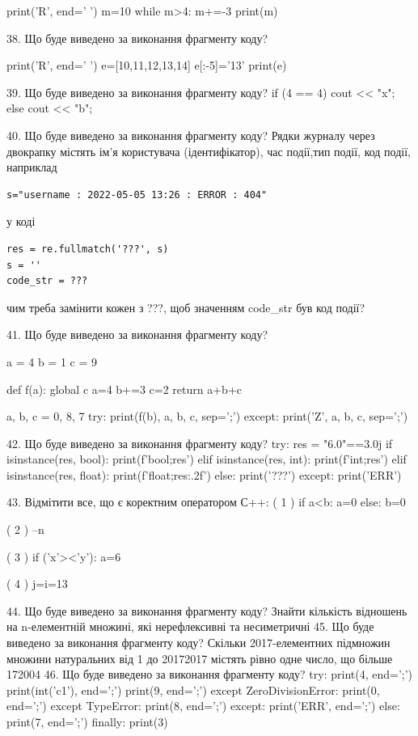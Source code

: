 \documentclass[11pt]{article}
\begin{document}
print('R', end=' ')
m=10
while m>4:
    m+=-3
print(m)


38. Що буде виведено за виконання фрагменту коду?

print('R', end=' ')
e=[10,11,12,13,14]
e[:-5]='13'
print(e)


39. Що буде виведено за виконання фрагменту коду?
if (4 == 4)
    cout << "x";
else
    cout << "b";


40. Що буде виведено за виконання фрагменту коду?
Рядки журналу через двокрапку містять ім'я користувача (ідентифікатор), час події,тип події, код події, наприклад
\begin{verbatim}
s="username : 2022-05-05 13:26 : ERROR : 404"
\end{verbatim}
у коді 
\begin{verbatim}
res = re.fullmatch('???', s) 
s = ''
code_str = ??? 
\end{verbatim}
чим треба замінити кожен з ???, щоб значенням code\_str був код події? 



41. Що буде виведено за виконання фрагменту коду?

a = 4
b = 1
c = 9

def f(a):
global c    a=4
    b+=3
    c=2
    return a+b+c

a, b, c = 0, 8, 7
try:
    print(f(b), a, b, c, sep=';')
except:
    print('Z', a, b, c, sep=';')

42. Що буде виведено за виконання фрагменту коду?
try:
    res = "6.0"==3.0j
    if isinstance(res, bool):
        print(f'bool;{res}')
    elif isinstance(res, int):
        print(f'int;{res}')
    elif isinstance(res, float):
        print(f'float;{res:.2f}')
    else:
        print('???')
except:
    print('ERR')

43. %
Відмітити все, що є коректним оператором С++:
( 1 ) if a<b: a=0 else: b=0

( 2 ) --n

( 3 ) if ('x'><'y'): a=6

( 4 ) j=i=13

44. Що буде виведено за виконання фрагменту коду?
Знайти кількість відношень на n-елементній множині, які нерефлексивні та несиметричні
45. Що буде виведено за виконання фрагменту коду?
Скільки 2017-елементних підмножин множини натуральних від 1 до 20172017 містять рівно одне число, що більше 172004
46. Що буде виведено за виконання фрагменту коду?
try:
    print(4, end=';')
    print(int('c1'), end=';')
    print(9, end=';')
except ZeroDivisionError:
    print(0, end=';')
except TypeError:
    print(8, end=';')
except:
    print('ERR', end=';')
else:
    print(7, end=';')
finally:
    print(3)
\end{document}
